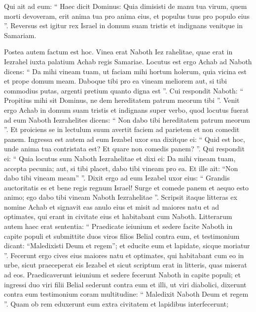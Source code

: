 \begin{biblechapter}
\begin{biblechapter}
\begin{biblechapter}
\begin{biblechapter}
\begin{biblechapter}
\begin{biblechapter}
\begin{biblechapter}
\begin{biblechapter}
\begin{biblechapter}
\begin{biblechapter}
\begin{biblechapter}
\begin{biblechapter}
\begin{biblechapter}
\begin{biblechapter}
\begin{biblechapter}
\begin{biblechapter}
\begin{biblechapter}
\begin{biblechapter}
\begin{biblechapter}
\begin{biblechapter}
\verse Qui ait ad eum: “ Haec dicit Dominus: Quia dimisisti de manu tua virum, quem morti devoveram, erit anima tua pro anima eius, et populus tuus pro populo eius ”. 
\verse Reversus est igitur rex Israel in domum suam tristis et indignans venitque in Samariam.
 
\begin{biblechapter}
\verse Postea autem factum est hoc. Vinea erat Naboth Iez rahelitae, quae erat in Iezrahel iuxta palatium Achab regis Samariae. 
\verse Locutus est ergo Achab ad Naboth dicens: “ Da mihi vineam tuam, ut faciam mihi hortum holerum, quia vicina est et prope domum meam. Daboque tibi pro ea vineam meliorem aut, si tibi commodius putas, argenti pretium quanto digna est ”. 
\verse Cui respondit Naboth: “ Propitius mihi sit Dominus, ne dem hereditatem patrum meorum tibi ”.
 \verse Venit ergo Achab in domum suam tristis et indignans super verbo, quod locutus fuerat ad eum Naboth Iezrahelites dicens: “ Non dabo tibi hereditatem patrum meorum ”. Et proiciens se in lectulum suum avertit faciem ad parietem et non comedit panem. 
\verse Ingressa est autem ad eum Iezabel uxor sua dixitque ei: “ Quid est hoc, unde anima tua contristata est? Et quare non comedis panem? ”. 
 \verse Qui respondit ei: “ Quia locutus sum Naboth Iezrahelitae et dixi ei: Da mihi vineam tuam, accepta pecunia; aut, si tibi placet, dabo tibi vineam pro ea. Et ille ait: “Non dabo tibi vineam meam” ”. 
\verse Dixit ergo ad eum Iezabel uxor eius: “ Grandis auctoritatis es et bene regis regnum Israel! Surge et comede panem et aequo esto animo; ego dabo tibi vineam Naboth Iezrahelitae ”.
 \verse Scripsit itaque litteras ex nomine Achab et signavit eas anulo eius et misit ad maiores natu et ad optimates, qui erant in civitate eius et habitabant cum Naboth. 
\verse Litterarum autem haec erat sententia: “ Praedicate ieiunium et sedere facite Naboth in capite populi 
\verse et submittite duos viros filios Belial contra eum, et testimonium dicant: “Maledixisti Deum et regem”; et educite eum et lapidate, sicque moriatur ”. 
\verse Fecerunt ergo cives eius maiores natu et optimates, qui habitabant cum eo in urbe, sicut praeceperat eis Iezabel et sicut scriptum erat in litteris, quas miserat ad eos. 
\verse Praedicaverunt ieiunium et sedere fecerunt Naboth in capite populi; 
\verse et ingressi duo viri filii Belial sederunt contra eum et illi, ut viri diabolici, dixerunt contra eum testimonium coram multitudine: “ Maledixit Naboth Deum et regem ”. Quam ob rem eduxerunt eum extra civitatem et lapidibus interfecerunt; 

\end{biblechapter}
\end{biblechapter}
\end{biblechapter}
\end{biblechapter}
\end{biblechapter}
\end{biblechapter}
\end{biblechapter}
\end{biblechapter}
\end{biblechapter}
\end{biblechapter}
\end{biblechapter}
\end{biblechapter}
\end{biblechapter}
\end{biblechapter}
\end{biblechapter}
\end{biblechapter}
\end{biblechapter}
\end{biblechapter}
\end{biblechapter}
\end{biblechapter}
\end{biblechapter}
